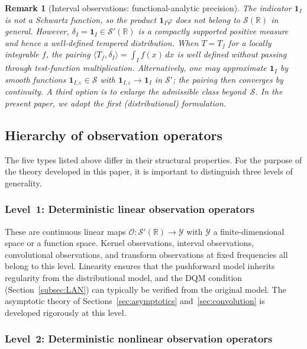 \documentclass[11pt,a4paper]{article}
\newtheorem{remark}[theorem]{Remark}
\newcommand{\R}{\mathbb{R}}
\begin{document}
\begin{remark}[Interval observations: functional-analytic precision]\label{rem:interval-fa}
The indicator $\mathbf{1}_I$ is not a Schwartz function, so the product
$\mathbf{1}_I \varphi$ does not belong to $\mathcal S(\R)$ in general.
However, $\delta_I = \mathbf{1}_I \in \mathcal S'(\R)$ is a compactly
supported positive measure and hence a well-defined tempered distribution.
When $T = T_f$ for a locally integrable $f$, the pairing
$\langle T_f, \delta_I \rangle = \int_I f(x)\,dx$ is well defined without
passing through test-function multiplication.  Alternatively, one may
approximate $\mathbf{1}_I$ by smooth functions
$\mathbf{1}_{I,\varepsilon} \in \mathcal S$ with
$\mathbf{1}_{I,\varepsilon} \to \mathbf{1}_I$ in $\mathcal S'$; the pairing
then converges by continuity.  A third option is to enlarge the
admissible class beyond~$\mathcal S$.  In the present paper, we adopt the
first (distributional) formulation.
\end{remark}

\subsection{Hierarchy of observation operators}\label{subsec:operator-hierarchy}

The five types listed above differ in their structural properties.  For the
purpose of the theory developed in this paper, it is important to
distinguish three levels of generality.

\subsubsection*{Level~1: Deterministic linear observation operators}

These are continuous linear maps $\mathcal O : \mathcal S'(\R) \to
\mathcal Y$ with $\mathcal Y$ a finite-dimensional space or a function
space.  Kernel observations, interval observations, convolutional
observations, and transform observations at fixed frequencies all belong
to this level.  Linearity ensures that the pushforward model inherits
regularity from the distributional model, and the DQM condition
(Section~\ref{subsec:LAN}) can typically be verified from the original
model.  The asymptotic theory of Sections~\ref{sec:asymptotics}
and~\ref{sec:convolution} is developed rigorously at this level.

\subsubsection*{Level~2: Deterministic nonlinear observation operators}
\end{document}
